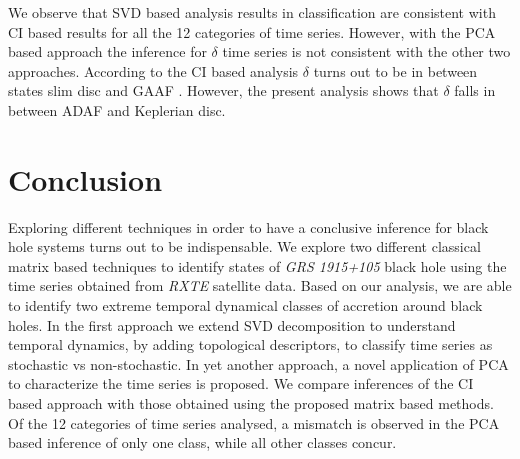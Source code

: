 \documentclass[journal]{IEEEtran}
\begin{document}
	We observe that SVD based analysis results in classification are consistent with CI based results for all the 12 categories of time series. However, with the PCA based approach the inference for  $\delta$ time series is not consistent with the other two approaches. According to the CI based analysis $\delta$ turns out to be in between states slim disc and GAAF \cite{Adegoke2018}. However, the present analysis shows that $\delta$ falls in between ADAF and Keplerian disc.
	
	
	\section{Conclusion}
	Exploring different techniques in order to have a conclusive inference for black hole systems turns out to be indispensable. We explore two different classical matrix based techniques to identify states of \textit{GRS 1915+105} black hole using the time series obtained from \textit{RXTE} satellite data. Based on our analysis, we are able to identify two extreme temporal dynamical classes of accretion around black holes. In the first approach we extend  SVD decomposition to understand temporal dynamics,  by adding  topological descriptors, to classify time series as stochastic vs non-stochastic. In yet another approach, a novel application of  PCA  to characterize the time series is proposed. We compare inferences of the CI based approach with those obtained using the proposed matrix based methods. Of the 12 categories of time series analysed, a mismatch is observed in the PCA based inference of only one class, while all other classes concur.
	
\end{document}
